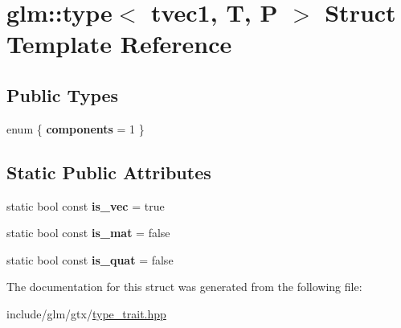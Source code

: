 \hypertarget{structglm_1_1type_3_01tvec1_00_01T_00_01P_01_4}{}\section{glm\+:\+:type$<$ tvec1, T, P $>$ Struct Template Reference}
\label{structglm_1_1type_3_01tvec1_00_01T_00_01P_01_4}
\subsection*{Public Types}
\begin{DoxyCompactItemize}
\item 
\mbox{\label{structglm_1_1type_3_01tvec1_00_01T_00_01P_01_4_aee33c015ad5b0f017aeffd8612a8a34e}} 
enum \{ {\bfseries components} = 1
 \}
\end{DoxyCompactItemize}
\subsection*{Static Public Attributes}
\begin{DoxyCompactItemize}
\item 
\mbox{\label{structglm_1_1type_3_01tvec1_00_01T_00_01P_01_4_adbc01bdae03ced483f6879a6c480f0fa}} 
static bool const {\bfseries is\+\_\+vec} = true
\item 
\mbox{\label{structglm_1_1type_3_01tvec1_00_01T_00_01P_01_4_adbe064ba8e73ecdd44594a3544d31101}} 
static bool const {\bfseries is\+\_\+mat} = false
\item 
\mbox{\label{structglm_1_1type_3_01tvec1_00_01T_00_01P_01_4_af558f7c8789d4153d3a859e75aa76040}} 
static bool const {\bfseries is\+\_\+quat} = false
\end{DoxyCompactItemize}


The documentation for this struct was generated from the following file\+:\begin{DoxyCompactItemize}
\item 
include/glm/gtx/\hyperlink{type__trait_8hpp}{type\+\_\+trait.\+hpp}\end{DoxyCompactItemize}
